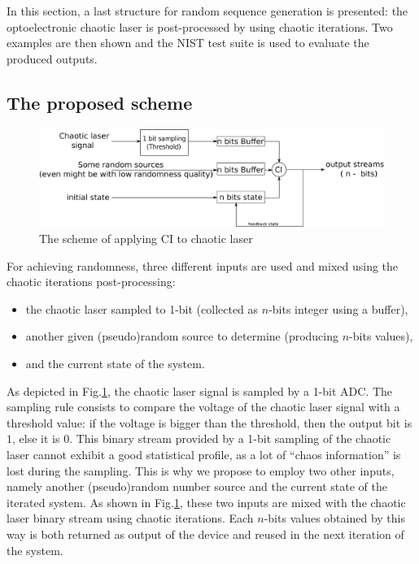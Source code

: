 In this section, a last structure for random sequence generation is presented: the optoelectronic chaotic laser is post-processed by using chaotic iterations.
Two examples are then shown and the NIST test suite is used to evaluate 
the produced outputs.

\subsection{The proposed scheme}
\begin{figure}
\centering
\includegraphics[scale=0.3]{CI_Photononic.eps}
\caption{The scheme of applying CI to chaotic laser}
\label{The scheme of applying CI to chaotic laser}
\end{figure}

For achieving randomness, three different inputs are used and mixed using
the chaotic iterations post-processing:
\begin{itemize}
\item the chaotic laser sampled to 1-bit (collected as $n$-bits integer using a buffer),
\item another given (pseudo)random source to determine (producing $n$-bits values),
\item and the current state of the system. 
\end{itemize}
As depicted in Fig.\ref{The scheme of applying CI to chaotic laser}, the chaotic laser 
signal is sampled by a 1-bit ADC. The sampling rule consists to compare the voltage of 
the chaotic laser signal with a threshold value: if the voltage is bigger than the
threshold, then the output bit is $1$, else it is $0$. 
This binary stream provided by a 1-bit sampling of the chaotic laser cannot exhibit 
a good statistical profile, as a lot of ``chaos information'' is lost during the sampling.
This is why we propose to employ two other inputs, namely
another (pseudo)random number source and the current state 
of the iterated system. As shown in Fig.\ref{The scheme of applying CI to chaotic laser},
these two inputs are mixed with the chaotic laser binary stream using 
chaotic iterations. Each $n$-bits values obtained by this way is 
both returned as output of the device and reused in the next iteration
of the system.

